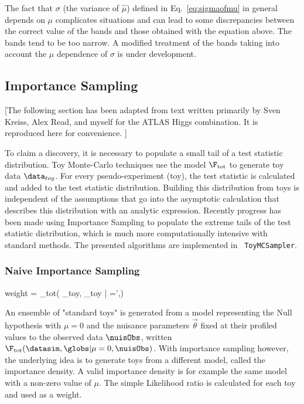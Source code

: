 The fact that $\sigma$ (the variance of $\hat{\mu}$) defined in Eq.~\ref{eq:sigmaofmu} in general depends on $\mu$ complicates situations and can lead to some discrepancies between the correct value of the bands and those obtained with the equation above.  The bands tend to be too narrow.  A modified treatment of the bands taking into account the $\mu$ dependence of $\sigma$ is under development.


\subsection{Importance Sampling}


[The following section has been adapted from text written primarily by Sven Kreiss, Alex Read, and myself for the ATLAS Higgs combination.  It is reproduced here for convenience. ]


To claim a discovery, it is necessary to populate a small tail of a test statistic distribution. Toy Monte-Carlo techniques use the model $\F_{\rm tot}$ to generate toy data $\data_{toy}$. For every pseudo-experiment (toy), the test statistic is calculated and added to the test statistic distribution. Building this distribution from toys is independent of the assumptions that go into the asymptotic calculation that describes this distribution with an analytic expression.   Recently progress has been made using Importance Sampling to populate the extreme tails of the test statistic distribution, which is much more computationally intensive with standard methods. The presented algorithms are implemented in \roostats\ \texttt{ToyMCSampler}.


\subsubsection{Naive Importance Sampling}



{\rm weight} =  {\F_{\rm tot}( \data_{\rm toy}, \globs_{\rm toy} | \mu=\mu',\nuisObs)}


An ensemble of "standard toys" is generated from a model representing the Null hypothesis with $\mu=0$ and the nuisance parameters $\vec\theta$ fixed at their profiled values to the observed data $\nuisObs$, written\\ \mbox{$\F_{\rm tot}(\datasim,\globs|\mu=0,\nuisObs)$}. With importance sampling however, the underlying idea is to generate toys from a different model, called the importance density. A valid importance density is for example the same model with a non-zero value of $\mu$. The simple Likelihood ratio is calculated for each toy and used as a weight.


